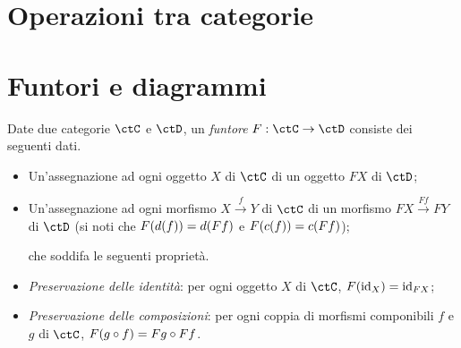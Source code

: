 \section{Operazioni tra categorie}


\section{Funtori e diagrammi}

\begin{definition}[Funtore]\label{def_funtore}
	Date due categorie \(\ctC\) e \(\ctD\), un \emph{funtore} \(F:\ctC\to\ctD\) consiste dei seguenti dati.
	\begin{itemize}
		\item Un'assegnazione ad ogni oggetto \(X\) di \(\ctC\) di un oggetto \(FX\) di \(\ctD\);
		\item Un'assegnazione ad ogni morfismo \(X \xrightarrow{f} Y\) di \(\ctC\) di un morfismo \(FX \xrightarrow{Ff} FY\) di \(\ctD\) (si noti che \(F(d(f))=d(Ff)\) e \(F(c(f))=c(Ff)\));

		      che soddifa le seguenti proprietà.
		\item \emph{Preservazione delle identità}: per ogni oggetto \(X\) di \(\ctC\), \(F(\mathrm{id}_X)=\mathrm{id}_{FX}\);
		\item \emph{Preservazione delle composizioni}: per ogni coppia di morfismi componibili \(f\) e \(g\) di \(\ctC\), \(F(g\circ f)=Fg\circ Ff\).
	\end{itemize}
\end{definition}




